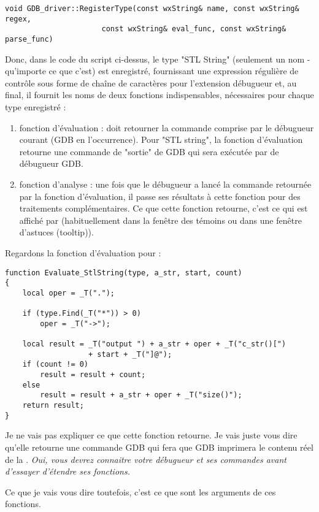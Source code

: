 \begin{lstlisting}
void GDB_driver::RegisterType(const wxString& name, const wxString& regex, 
                      const wxString& eval_func, const wxString& parse_func)
\end{lstlisting}

Donc, dans le code du script ci-dessus, le type "STL String" (seulement un nom - qu'importe ce que c'est) est enregistré, fournissant une expression régulière de contrôle sous forme de chaîne de caractères pour l'extension débugueur et, au final, il fournit les noms de deux fonctions indispensables, nécessaires pour chaque type enregistré :

\begin{enumerate}
\item fonction d'évaluation : doit retourner la commande comprise par le débugueur courant (GDB en l'occurrence). Pour "STL string", la fonction d'évaluation retourne une commande de "sortie" de GDB qui sera exécutée par de débugueur GDB.
\item fonction d'analyse : une fois que le débugueur a lancé la commande retournée par la fonction d'évaluation, il passe ses résultats à cette fonction pour des traitements complémentaires. Ce que cette fonction retourne, c'est ce qui est affiché par \codeblocks (habituellement dans la fenêtre des témoins ou dans une fenêtre d'astuces (tooltip)).
\end{enumerate}


Regardons la fonction d'évaluation pour :

\begin{lstlisting}
function Evaluate_StlString(type, a_str, start, count)
{
    local oper = _T(".");

    if (type.Find(_T("*")) > 0)
        oper = _T("->");

    local result = _T("output ") + a_str + oper + _T("c_str()[") 
                   + start + _T("]@");
    if (count != 0)
        result = result + count;
    else
        result = result + a_str + oper + _T("size()");
    return result;
}
\end{lstlisting}

Je ne vais pas expliquer ce que cette fonction retourne. Je vais juste vous dire qu'elle retourne une commande GDB qui fera que GDB imprimera le contenu réel de la . \textit{Oui, vous devrez connaitre votre débugueur et ses commandes avant d'essayer d'étendre ses fonctions.}

Ce que je vais vous dire toutefois, c'est ce que sont les arguments de ces fonctions.

